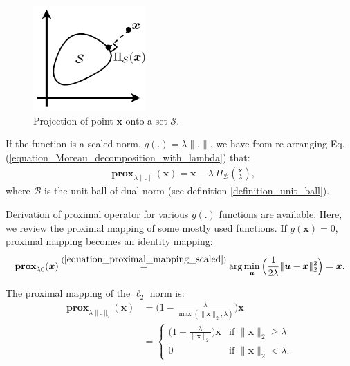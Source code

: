 \documentclass[lang=cn,10pt]{gorgeousnbook}
\numberwithin{equation}{section}%
\numberwithin{figure}{section}%
\begin{document}
\begin{figure}[!t]
\centering
\includegraphics[width=1.7in]{./images/projection_onto_set}
\caption{Projection of point $\boldsymbol{x}$ onto a set $\mathcal{S}$.}
\label{figure_projection_onto_set}
\end{figure}

\begin{corollary}
If the function is a scaled norm, $g(.) = \lambda \|.\|$, we have from re-arranging Eq. (\ref{equation_Moreau_decomposition_with_lambda}) that:
\begin{align}\label{equation_Moreau_decomposition_norm}
& \textbf{prox}_{\lambda \|.\|}(\boldsymbol{x}) = \boldsymbol{x} - \lambda\, \Pi_\mathcal{B}(\frac{\boldsymbol{x}}{\lambda}), 
\end{align}
where $\mathcal{B}$ is the unit ball of dual norm (see definition \ref{definition_unit_ball}). 
\end{corollary}

Derivation of proximal operator for various $g(.)$ functions are available.
Here, we review the proximal mapping of some mostly used functions.
If $g(\boldsymbol{x}) = 0$, proximal mapping becomes an identity mapping:
\begin{align*}
\textbf{prox}_{\lambda 0}(\boldsymbol{x}) \overset{(\ref{equation_proximal_mapping_scaled})}{=} \arg\min_{\boldsymbol{u}} \Big( \frac{1}{2\lambda} \|\boldsymbol{u} - \boldsymbol{x}\|_2^2 \Big) = \boldsymbol{x}.
\end{align*}

\begin{lemma} \label{lemma_prox_l2_norm}
The proximal mapping of the $\ell_2$ norm is:
\begin{equation}\label{equation_proximal_mapping_scaled_l2_norm}
\begin{aligned}
\textbf{prox}_{\lambda \|.\|_2}(\boldsymbol{x}) &= \Big( 1 - \frac{\lambda}{\max(\|\boldsymbol{x}\|_2, \lambda)} \Big) \boldsymbol{x} \\
&= 
\left\{
    \begin{array}{ll}
        \big( 1 - \frac{\lambda}{\|\boldsymbol{x}\|_2} \big) \boldsymbol{x} & \mbox{if } \|\boldsymbol{x}\|_2 \geq \lambda \\
        0 & \mbox{if } \|\boldsymbol{x}\|_2 < \lambda.
    \end{array}
\right.
\end{aligned}
\end{equation}
\end{lemma}
\end{document}
